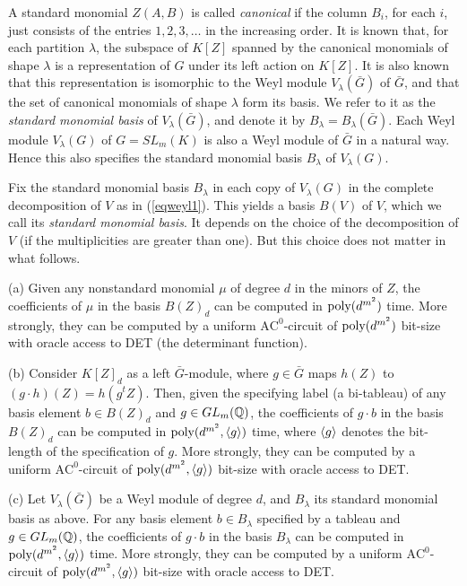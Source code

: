 \documentclass[11pt]{article}
\begin{document}
A standard monomial $Z(A,B)$ is called 
{\em canonical} if the column $B_i$, for each $i$, just consists of the entries $1,2,3,\ldots$ in the increasing
order.
It is known \cite{raghavan}  that, for each partition $\lambda$,  the subspace of $K[Z]$ spanned 
by the canonical monomials of shape $\lambda$ is a representation of $G$ under its left action  on $K[Z]$.
It is also  known \cite{raghavan} that this representation is isomorphic to the Weyl module $V_\lambda(\bar G)$ of $\bar G$, and
that the set of canonical monomials of shape $\lambda$ form its basis. We refer to it as the 
{\em standard monomial basis} of $V_\lambda(\bar G)$, and denote it by $B_\lambda=B_\lambda(\bar G)$.
Each Weyl module $V_\lambda(G)$ of  $G=SL_m(K)$ is also a Weyl module of $\bar G$ in a natural way. 
Hence this also specifies the standard monomial basis $B_\lambda$  of $V_\lambda(G)$.

Fix the standard monomial basis $B_\lambda$ in  each copy of $V_\lambda(G)$ in the complete decomposition
of $V$  as in (\ref{eqweyl1}). This yields a basis $B(V)$ of $V$, which we call its {\em standard monomial basis}.
It depends on the choice of the decomposition of $V$ (if the multiplicities are greater than one). 
But this choice does not matter in what follows.



\begin{lemma} \label{ldrsstraight}

\noindent (a) Given  any   nonstandard monomial $\mu$  of degree $d$ in the minors of $Z$,
the  coefficients  of $\mu$  in the basis $B(Z)_d$ can be computed 
in ${\mbox {poly}}(d^{m^2})$ time. More strongly, they can be computed 
by a uniform $\mbox{AC}^0$-circuit of   ${\mbox {poly}}(d^{m^2})$ bit-size with oracle access to DET (the determinant function).

\noindent (b)  Consider $K[Z]_d$ as a left $\bar G$-module, 
where $g \in \bar G$ maps $h(Z)$ to $(g \cdot h)(Z)=h(g^{t} Z)$. Then,
given the specifying label (a bi-tableau)  of any basis element $b \in B(Z)_d$  and 
$g \in GL_m(\mathbb{Q})$, the coefficients  of $g \cdot b$ in the basis $B(Z)_d$ 
can be computed in ${\mbox {poly}}(d^{m^2},\langle g \rangle)$ time, where $\langle g \rangle$ denotes the bit-length of the specification of $g$. 
More strongly, they  can be computed 
by a uniform $\mbox{AC}^0$-circuit of   ${\mbox {poly}}(d^{m^2},\langle g \rangle)$ bit-size with oracle access to DET.


\noindent (c) Let $V_\lambda(\bar G)$ be a Weyl module of degree $d$, and
$B_\lambda$ its standard monomial basis as above. 
For any  basis element $b \in B_\lambda$ specified by a tableau and $g \in GL_m(\mathbb{Q})$, 
the coefficients  of $g \cdot b$ in the basis $B_\lambda$ 
can be  computed in ${\mbox {poly}}(d^{m^2},\langle g \rangle)$ time.
More strongly, they  can be computed 
by a uniform $\mbox{AC}^0$-circuit of   ${\mbox {poly}}(d^{m^2},\langle g \rangle)$ bit-size with oracle access to DET.
\end{lemma}
\end{document}
